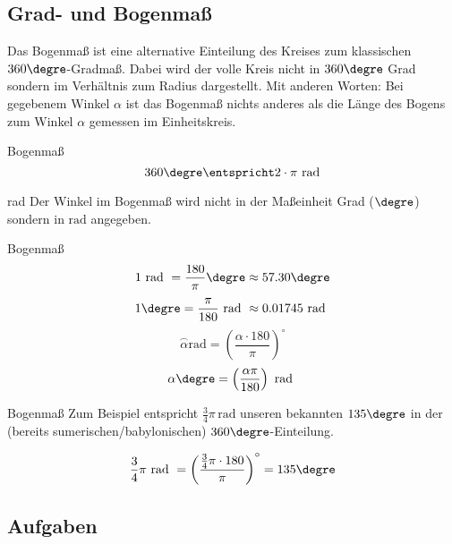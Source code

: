 
\subsection{Grad- und Bogenmaß}


Das Bogenmaß ist eine alternative Einteilung des Kreises zum
klassischen $360\degre$-Gradmaß. Dabei wird der volle Kreis nicht in
$360\degre$ Grad sondern im Verhältnis zum Radius dargestellt. Mit
anderen Worten: Bei gegebenem Winkel $\alpha$ ist das Bogenmaß nichts
anderes als die Länge des Bogens zum Winkel $\alpha$ gemessen im Einheitskreis.


\begin{definition}{Bogenmaß}{}
$$360\degre \entspricht 2\cdot\pi \text{\,\,rad}$$
\end{definition}

\begin{bemerkung}{rad}{}
Der Winkel im Bogenmaß wird nicht in der Maßeinheit Grad (${}\degre$)
sondern in $\text{rad}$ angegeben.
\end{bemerkung}

\begin{gesetz}{Bogenmaß}{}
$$1 \text{ rad } = \frac{180}{\pi}\degre \approx 57.30\degre$$
$$1\degre = \frac{\pi}{180} \text{ rad } \approx 0.01745 \text{ rad }$$
$$\stackrel{\frown}{\alpha} \text{rad} = \left(\frac{\alpha\cdot{}180}{\pi}\right)^\circ$$
$$\alpha\degre = \left(\frac{\alpha\pi}{180}\right) \text{ rad }$$  
\end{gesetz}

\begin{beispiel}{Bogenmaß}{}
 Zum Beispiel entspricht
$\frac{3}{4}\pi\,\text{rad}$ unseren bekannten $135\degre$ in der
(bereits sumerischen/babylonischen) $360\degre$-Einteilung.

 $$\frac34\pi \text{ rad } = \left(\frac{\frac34\pi\cdot{}180}{\pi}\right)^\circ = 135\degre$$
\end{beispiel}
\newpage



\subsection*{Aufgaben}



\newpage
